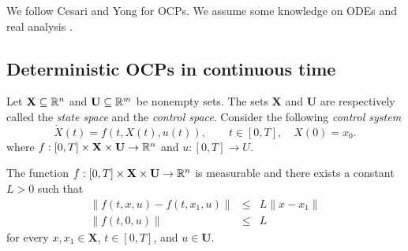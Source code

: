 We follow Cesari \cite{Cesari83} and Yong \cite{Yong2015} for OCPs. We assume some knowledge on ODEs \cite{Teschl} and real analysis \cite{Loeb2016}.

\subsection{Deterministic OCPs in continuous time}

Let $\mathbf{X}\subseteq\mathbb{R}^n$ and $\mathbf{U}\subseteq \mathbb{R}^m$ be nonempty sets. The sets $\mathbf{X}$ and $\mathbf{U}$ are 
respectively called the {\it state space} and the {\it control space}. Consider 
the following {\it control system}
\begin{equation}\label{CoDiffEq}
\dot{X}(t)=f(t,X(t),u(t)),\qquad t\in[0,T], \quad X(0)=x_0.
\end{equation}
where $f:[0,T]\times \mathbf{X}\times \mathbf{U}\to \mathbb{R}^n$ and $u:[0,T]\to U$. 

\begin{assumption}\label{Assum1}  The function $f:[0,T]\times \mathbf{X}\times \mathbf{U}\to \mathbb{R}^n$
is measurable and there exists a constant $L>0$ such that
\begin{eqnarray}
  \|f(t,x,u)-f(t,x_1,u)\| & \leq & L\|x-x_1\|\label{LipfInx}\\
  \|f(t,0,u)\| & \leq & L\label{fBound}
\end{eqnarray}
for every $x,x_1\in \mathbf{X}$, $t\in[0,T]$, and $u\in \mathbf{U}$.
\end{assumption}


